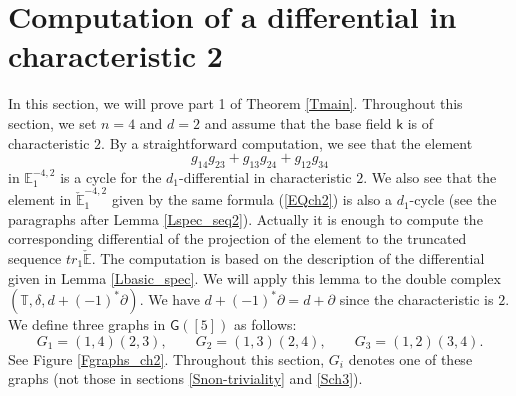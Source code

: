 \documentclass[reqno]{amsart}
\theoremstyle{definition}
\theoremstyle{plain}
\newtheorem{lem}[defi]{Lemma}
\newcommand{\eps}{\epsilon}
\newcommand{\CEE}{\check{\mathbb{E}}}
\newcommand{\TTH}{\mathbb{T}}%
\newcommand{\GG}{\mathsf{G}}%
\newcommand{\EE}{\mathbb{E}}
\newcommand{\kk}{\mathsf{k}}
\begin{document}






\section{Computation of a differential in characteristic 2}\label{Sch2}
In this section, we will prove part 1 of Theorem \ref{Tmain}. Throughout this section, we set $n=4$ and $d=2$ and assume that the base field $\kk$ is  of characteristic $2$. 
 By a straightforward computation, we see that the element 
\begin{equation}
g_{14}g_{23}+g_{13}g_{24}+g_{12}g_{34} \label{EQch2}
\end{equation} in $\EE^{-4,2}_1$ is a cycle for the $d_1$-differential  in characteristic $2$. We also see that the  element in $\CEE^{-4,2}_1$ given by the same formula (\ref{EQch2}) is also a $d_1$-cycle  (see the  paragraphs after Lemma \ref{Lspec_seq2}). Actually it is enough to compute the corresponding differential of the projection of the element  to the truncated  sequence $tr_1\CEE$. The computation is based on  the description of the differential given in Lemma \ref{Lbasic_spec}. We will apply this lemma to the double complex $(\TTH, \delta, d+(-1)^*\partial )$. We have $d+(-1)^*\partial =d+\partial$ since the characteristic is $2$.
\\ 
\indent We define three graphs in $\GG([5])$ as follows:
\[
G_1=(1,4)(2,3),\qquad G_2=(1,3)(2,4),\qquad G_3=(1,2)(3,4).
\]
See Figure  \ref{Fgraphs_ch2}. Throughout this section, $G_i$ denotes one of these graphs (not those in sections \ref{Snon-triviality} and \ref{Sch3}). 
\end{document}
